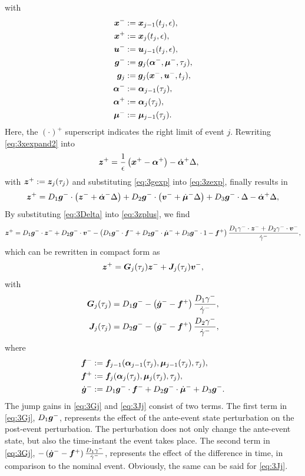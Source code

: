 \documentclass[../DC2019003Bouma.tex]{subfiles}
\begin{document}
with
\begin{align*}
{\boldsymbol{x}}^- &:= {\boldsymbol{x}}_{j-1}(t_{j},\epsilon),\\
{\boldsymbol{x}}^+ &:= {\boldsymbol{x}}_{j}(t_{j},\epsilon),\\
{\boldsymbol{u}}^- &:= {\boldsymbol{u}}_{j-1}(t_{j},\epsilon),\\
{\boldsymbol{g}}^- &:= {\boldsymbol{g}}_j(\boldsymbol{\alpha}^-,\boldsymbol{\mu}^-,\tau_j),\\
{\boldsymbol{g}}_j &:= {\boldsymbol{g}}_j({\boldsymbol{x}}^-,{\boldsymbol{u}}^-,t_j),\\
\boldsymbol{\alpha}^- &:= \boldsymbol{\alpha}_{j-1}(\tau_j),\\
\boldsymbol{\alpha}^+ &:= \boldsymbol{\alpha}_j(\tau_j),\\
\boldsymbol{\mu}^- &:= \boldsymbol{\mu}_{j-1}(\tau_j).
\end{align*}
Here, the $(\cdot)^+$ superscript indicates the right limit of event $j$. Rewriting \eqref{eq:3xexpand2} into
\begin{align}
{\boldsymbol{z}}^+ &= \frac{1}{\epsilon}\left({\boldsymbol{x}}^{+} - \boldsymbol{\alpha}^+\right) -\dot{\boldsymbol{\alpha}}^+\Delta,\label{eq:3zexp}
\end{align}
with ${\boldsymbol{z}}^+ := {\boldsymbol{z}}_j(\tau_j)$ and substituting \eqref{eq:3gexp} into \eqref{eq:3zexp}, finally results in
\begin{equation}
{\boldsymbol{z}}^+ = D_1{\boldsymbol{g}}^-\cdot\left({\boldsymbol{z}}^- + \dot{\boldsymbol{\alpha}}^-\Delta\right) + D_2{\boldsymbol{g}}^-\cdot\left({\boldsymbol{v}}^- + \dot{\boldsymbol{\mu}}^-\Delta\right) + D_3{\boldsymbol{g}}^-\cdot\Delta - \dot{\boldsymbol{\alpha}}^+\Delta,\label{eq:3zplus}
\end{equation}
By substituting \eqref{eq:3Delta} into \eqref{eq:3zplus}, we find
\begin{align}
{\boldsymbol{z}}^+ = D_1{\boldsymbol{g}}^-\cdot{\boldsymbol{z}}^- + D_2{\boldsymbol{g}}^-\cdot{\boldsymbol{v}}^- - \left(D_1{\boldsymbol{g}}^-\cdot {\boldsymbol{f}}^- + D_2{\boldsymbol{g}}^-\cdot\dot{\boldsymbol{\mu}}^- + D_3{\boldsymbol{g}}^-\cdot 1 - {\boldsymbol{f}}^+\right)\frac{D_1\gamma^-\cdot{\boldsymbol{z}}^- + D_2\gamma^-\cdot{\boldsymbol{v}}^-}{\dot{\gamma}^-},
\end{align}
which can be rewritten in compact form as
\begin{align}
{\boldsymbol{z}}^+ = {\boldsymbol{G}}_j(\tau_j){\boldsymbol{z}}^- + {\boldsymbol{J}}_j(\tau_j){\boldsymbol{v}}^-,\label{eq:3zbplus}
\end{align}
with 
\begin{align}
{\boldsymbol{G}}_j(\tau_j) & = D_1{\boldsymbol{g}}^- - \left(\dot{{\boldsymbol{g}}}^- - {\boldsymbol{f}}^+\right)\frac{D_1\gamma^-}{\dot{\gamma}^-},\label{eq:3Gj}\\
{\boldsymbol{J}}_j(\tau_j) & = D_2{\boldsymbol{g}}^- - \left(\dot{{\boldsymbol{g}}}^- - {\boldsymbol{f}}^+\right)\frac{D_2\gamma^-}{\dot{\gamma}^-},\label{eq:3Jj}
\end{align}
where
\begin{align*}
{\boldsymbol{f}}^- &:= {\boldsymbol{f}}_{j-1}(\boldsymbol{\alpha}_{j-1}(\tau_j),\boldsymbol{\mu}_{j-1}(\tau_j),\tau_j),\\
{\boldsymbol{f}}^+ &:= {\boldsymbol{f}}_j(\boldsymbol{\alpha}_j(\tau_j),\boldsymbol{\mu}_j(\tau_j),\tau_j),\\
\dot{{\boldsymbol{g}}}^- &:= D_1{\boldsymbol{g}}^-\cdot {\boldsymbol{f}}^- + D_2{\boldsymbol{g}}^-\cdot \dot{\boldsymbol{\mu}}^- + D_3{\boldsymbol{g}}^-.
\end{align*}
The jump gains in \eqref{eq:3Gj} and \eqref{eq:3Jj} consist of two terms. The first term in \eqref{eq:3Gj}, $D_1{\boldsymbol{g}}^-$, represents the effect of the ante-event state perturbation on the post-event perturbation. The perturbation does not only change the ante-event state, but also the time-instant the event takes place. The second term in \eqref{eq:3Gj}, $- \left(\dot{{\boldsymbol{g}}}^- - {\boldsymbol{f}}^+\right)\frac{D_1\gamma^-}{\dot{\gamma}^-}$, represents the effect of the difference in time, in comparison to the nominal event. Obviously, the same can be said for \eqref{eq:3Jj}.
\end{document}
